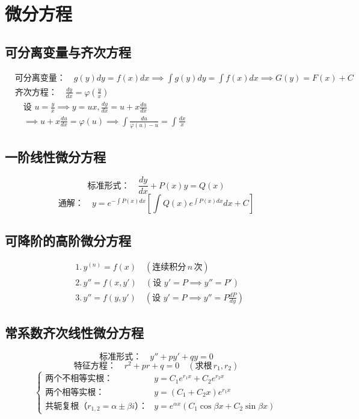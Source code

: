 \documentclass{article}
\begin{document}
\section{微分方程}
\subsection{可分离变量与齐次方程}
\[
\begin{aligned}
&\text{可分离变量：} \quad g(y)dy = f(x)dx \implies \int g(y)dy = \int f(x)dx \implies G(y) = F(x) + C \\
&\text{齐次方程：} \quad \frac{dy}{dx} = \varphi\left(\frac{y}{x}\right) \\
&\quad \text{设 } u = \frac{y}{x} \implies y = ux, \frac{dy}{dx} = u + x\frac{du}{dx} \\
&\quad \implies u + x\frac{du}{dx} = \varphi(u) \implies \int \frac{du}{\varphi(u)-u} = \int \frac{dx}{x}
\end{aligned}
\]

\subsection{一阶线性微分方程}
\[
\text{标准形式：} \quad \frac{dy}{dx} + P(x)y = Q(x)
\]
\[
\text{通解：} \quad y = e^{-\int P(x)dx} \left[ \int Q(x)e^{\int P(x)dx}dx + C \right]
\]

\subsection{可降阶的高阶微分方程}
\[
\begin{aligned}
&1. \, y^{(n)} = f(x) \quad (\text{连续积分} \, n \, \text{次}) \\
&2. \, y'' = f(x, y') \quad (\text{设 } y' = P \implies y'' = P') \\
&3. \, y'' = f(y, y') \quad (\text{设 } y' = P \implies y'' = P\frac{dP}{dy})
\end{aligned}
\]

\subsection{常系数齐次线性微分方程}
\[
\text{标准形式：} \quad y'' + py' + qy = 0
\]
\[
\text{特征方程：} \quad r^2 + pr + q = 0 \quad (\text{求根} \, r_1, r_2)
\]
\[
\begin{cases}
\text{两个不相等实根：} & y = C_1e^{r_1x} + C_2e^{r_2x} \\
\text{两个相等实根：} & y = (C_1 + C_2x)e^{r_1x} \\
\text{共轭复根（} r_{1,2} = \alpha \pm \beta i\text{）：} & y = e^{\alpha x}(C_1\cos\beta x + C_2\sin\beta x)
\end{cases}
\]
\end{document}
